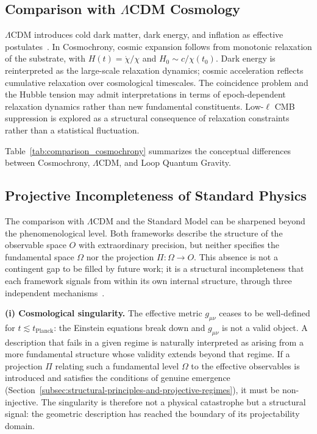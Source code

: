 \subsection{Comparison with \texorpdfstring{$\Lambda$}{Λ}CDM Cosmology}
\label{subsec:comparison-with-lambdacdm-cosmology}

$\Lambda$CDM introduces cold dark matter, dark energy, and inflation as effective
postulates~\cite{peebles1993principles,planck2020results}.
In Cosmochrony, cosmic expansion follows from monotonic relaxation of
the substrate, with $H(t) = \dot{\chi}/\chi$ and $H_0 \sim c/\chi(t_0)$.
Dark energy is reinterpreted as the large-scale relaxation dynamics;
cosmic acceleration reflects cumulative relaxation over cosmological timescales.
The coincidence problem and the Hubble tension may admit interpretations
in terms of epoch-dependent relaxation dynamics rather than new fundamental constituents.
Low-$\ell$ CMB suppression is explored as a structural consequence of
relaxation constraints rather than a statistical fluctuation.

Table~\ref{tab:comparison_cosmochrony} summarizes the conceptual
differences between Cosmochrony, $\Lambda$CDM, and Loop Quantum Gravity.

\subsection{Projective Incompleteness of Standard Physics}
\label{subsec:projective-incompleteness-standard-physics}

The comparison with $\Lambda$CDM and the Standard Model can be sharpened
beyond the phenomenological level.
Both frameworks describe the structure of the observable space $O$ with
extraordinary precision, but neither specifies the fundamental space $\Omega$
nor the projection $\Pi : \Omega \to O$.
This absence is not a contingent gap to be filled by future work; it is a
structural incompleteness that each framework signals from within its own
internal structure, through three independent mechanisms~\cite{Beau2026l}.

\textbf{(i) Cosmological singularity.}
The effective metric $g_{\mu\nu}$ ceases to be well-defined for
$t \lesssim t_{\mathrm{Planck}}$: the Einstein equations break down
and $g_{\mu\nu}$ is not a valid object.
A description that fails in a given regime is naturally interpreted as
arising from a more fundamental structure whose validity extends beyond
that regime.
If a projection $\Pi$ relating such a fundamental level $\Omega$ to the
effective observables is introduced and satisfies the conditions of
genuine emergence (Section~\ref{subsec:structural-principles-and-projective-regimes}),
it must be non-injective.
The singularity is therefore not a physical catastrophe but a structural
signal: the geometric description has reached the boundary of its
projectability domain.

